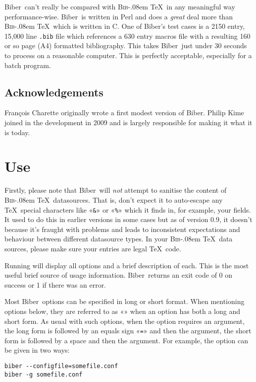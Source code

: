 \documentclass{ltxdockit}
\def\BibTeX{\textsc{Bib}\kern-.08em \TeX}
\newcommand*{\biber}{Biber\xspace}
\begin{document}
\biber\ can't really be compared with \BibTeX\ in any meaningful
way performance-wise. \biber\ is written in Perl and does a
\emph{great} deal more than \BibTeX\ which is written in C. One of
\biber's test cases is a 2150 entry, 15,000 line \verb+.bib+ file
which references a 630 entry macros file with a resulting 160 or so page (A4)
formatted bibliography. This takes \biber\ just under 30 seconds to process on
a reasonable computer. This is perfectly acceptable, especially for a
batch program.

\subsection{Acknowledgements}

François Charette originally wrote a first modest version of \biber. Philip Kime joined in
the development in 2009 and is largely responsible for making it what it is today. 

\section{Use}

Firstly, please note that \biber\ will \emph{not} attempt to sanitise
the content of \BibTeX\ datasources. That is, don't expect it to
auto-escape any \TeX\ special characters like «\verb+&+» or «\verb+%+» which
it finds in, for example, your  fields. It used to do this in
earlier versions in some cases but as of version 0.9, it doesn't because
it's fraught with problems and leads to inconsistent expectations and
behaviour between different datasource types. In your \BibTeX\ data
sources, please make sure your entries are legal \TeX\ code.

Running  will display all options and a brief
description of each. This is the most useful brief source of usage
information. \biber\ returns an exit code of 0 on success or 1 if
there was an error.

Most \biber\ options can be specified in long or short format. When
mentioning options below, they are referred to as
«» when an option has both a long and short
form. As usual with such options, when the option requires an argument, the
long form is followed by an equals sign «\verb+=+» and then the argument,
the short form is followed by a space and then the argument. For example,
the  option can be given in two ways:

\begin{verbatim}
biber --configfile=somefile.conf
biber -g somefile.conf
\end{verbatim}
\end{document}
